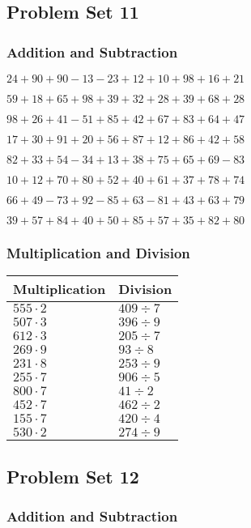 \hypertarget{problem-set-11}{%
\subsection{Problem Set 11}\label{problem-set-11}}

\hypertarget{addition-and-subtraction-10}{%
\subsubsection{Addition and
Subtraction}\label{addition-and-subtraction-10}}

\(24+90+90-13-23+12+10+98+16+21\)

\(59+18+65+98+39+32+28+39+68+28\)

\(98+26+41-51+85+42+67+83+64+47\)

\(17+30+91+20+56+87+12+86+42+58\)

\(82+33+54-34+13+38+75+65+69-83\)

\(10+12+70+80+52+40+61+37+78+74\)

\(66+49-73+92-85+63-81+43+63+79\)

\(39+57+84+40+50+85+57+35+82+80\)

\hypertarget{multiplication-and-division-10}{%
\subsubsection{Multiplication and
Division}\label{multiplication-and-division-10}}

\begin{longtable}[]{@{}ll@{}}
\toprule
Multiplication & Division\tabularnewline
\midrule
\endhead
\(555\cdot2\) & \(409÷7\)\tabularnewline
\(507\cdot3\) & \(396÷9\)\tabularnewline
\(612\cdot3\) & \(205÷7\)\tabularnewline
\(269\cdot9\) & \(93÷8\)\tabularnewline
\(231\cdot8\) & \(253÷9\)\tabularnewline
\(255\cdot7\) & \(906÷5\)\tabularnewline
\(800\cdot7\) & \(41÷2\)\tabularnewline
\(452\cdot7\) & \(462÷2\)\tabularnewline
\(155\cdot7\) & \(420÷4\)\tabularnewline
\(530\cdot2\) & \(274÷9\)\tabularnewline
\bottomrule
\end{longtable}

\hypertarget{problem-set-12}{%
\subsection{Problem Set 12}\label{problem-set-12}}

\hypertarget{addition-and-subtraction-11}{%
\subsubsection{Addition and
Subtraction}\label{addition-and-subtraction-11}}

